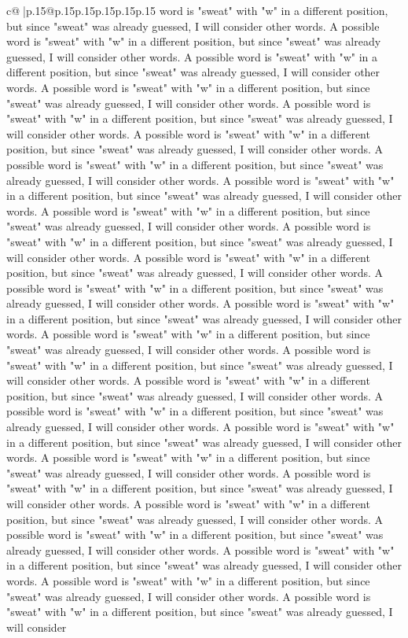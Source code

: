 \documentclass{article}
\begin{document}
{\begin{supertabular}{c@{$\;$}|p{.15\linewidth}@{}p{.15\linewidth}p{.15\linewidth}p{.15\linewidth}p{.15\linewidth}p{.15\linewidth}}
{{{word is "sweat" with "w" in a different position, but since "sweat" was already guessed, I will consider other words. A possible word is "sweat" with "w" in a different position, but since "sweat" was already guessed, I will consider other words. A possible word is "sweat" with "w" in a different position, but since "sweat" was already guessed, I will consider other words. A possible word is "sweat" with "w" in a different position, but since "sweat" was already guessed, I will consider other words. A possible word is "sweat" with "w" in a different position, but since "sweat" was already guessed, I will consider other words. A possible word is "sweat" with "w" in a different position, but since "sweat" was already guessed, I will consider other words. A possible word is "sweat" with "w" in a different position, but since "sweat" was already guessed, I will consider other words. A possible word is "sweat" with "w" in a different position, but since "sweat" was already guessed, I will consider other words. A possible word is "sweat" with "w" in a different position, but since "sweat" was already guessed, I will consider other words. A possible word is "sweat" with "w" in a different position, but since "sweat" was already guessed, I will consider other words. A possible word is "sweat" with "w" in a different position, but since "sweat" was already guessed, I will consider other words. A possible word is "sweat" with "w" in a different position, but since "sweat" was already guessed, I will consider other words. A possible word is "sweat" with "w" in a different position, but since "sweat" was already guessed, I will consider other words. A possible word is "sweat" with "w" in a different position, but since "sweat" was already guessed, I will consider other words. A possible word is "sweat" with "w" in a different position, but since "sweat" was already guessed, I will consider other words. A possible word is "sweat" with "w" in a different position, but since "sweat" was already guessed, I will consider other words. A possible word is "sweat" with "w" in a different position, but since "sweat" was already guessed, I will consider other words. A possible word is "sweat" with "w" in a different position, but since "sweat" was already guessed, I will consider other words. A possible word is "sweat" with "w" in a different position, but since "sweat" was already guessed, I will consider other words. A possible word is "sweat" with "w" in a different position, but since "sweat" was already guessed, I will consider other words. A possible word is "sweat" with "w" in a different position, but since "sweat" was already guessed, I will consider other words. A possible word is "sweat" with "w" in a different position, but since "sweat" was already guessed, I will consider other words. A possible word is "sweat" with "w" in a different position, but since "sweat" was already guessed, I will consider other words. A possible word is "sweat" with "w" in a different position, but since "sweat" was already guessed, I will consider other words. A possible word is "sweat" with "w" in a different position, but since "sweat" was already guessed, I will consider }}}
\end{supertabular}}
\end{document}
